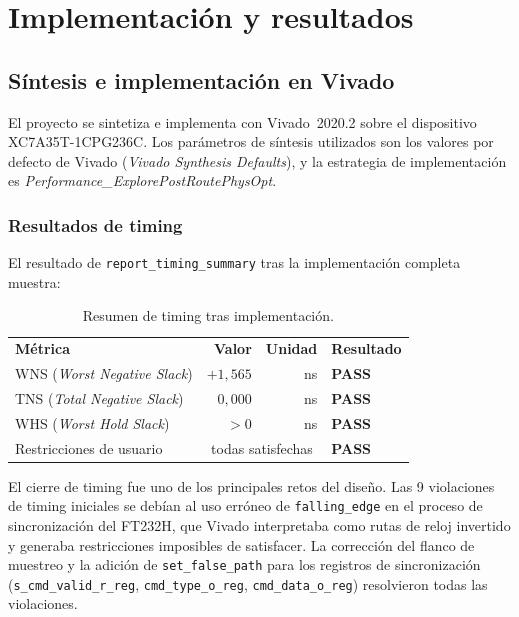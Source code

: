 \documentclass[../main.tex]{subfiles}
\begin{document}
\chapter{Implementación y resultados}
\label{chap:implementacion}

\section{Síntesis e implementación en Vivado}

El proyecto se sintetiza e implementa con Vivado~2020.2 sobre el dispositivo XC7A35T-1CPG236C. Los parámetros de síntesis utilizados son los valores por defecto de Vivado (\textit{Vivado Synthesis Defaults}), y la estrategia de implementación es \textit{Performance\_ExplorePostRoutePhysOpt}.

\subsection{Resultados de timing}

El resultado de \texttt{report\_timing\_summary} tras la implementación completa muestra:

\begin{table}[h]
\centering
\caption{Resumen de timing tras implementación.}
\label{tab:timing}
\begin{tabular}{lrrl}
\rowcolor[HTML]{156082}
{\color{white}\textbf{Métrica}} & {\color{white}\textbf{Valor}} & {\color{white}\textbf{Unidad}} & {\color{white}\textbf{Resultado}} \\
\rowcolor[HTML]{C0E6F5}
WNS (\textit{Worst Negative Slack}) & $+1{,}565$ & ns & \textbf{PASS} \\
TNS (\textit{Total Negative Slack}) & $0{,}000$ & ns & \textbf{PASS} \\
\rowcolor[HTML]{C0E6F5}
WHS (\textit{Worst Hold Slack}) & $> 0$ & ns & \textbf{PASS} \\
Restricciones de usuario & \multicolumn{2}{c}{todas satisfechas} & \textbf{PASS} \\
\end{tabular}
\end{table}

El cierre de timing fue uno de los principales retos del diseño. Las 9 violaciones de timing iniciales se debían al uso erróneo de \texttt{falling\_edge} en el proceso de sincronización del FT232H, que Vivado interpretaba como rutas de reloj invertido y generaba restricciones imposibles de satisfacer. La corrección del flanco de muestreo y la adición de \texttt{set\_false\_path} para los registros de sincronización (\texttt{s\_cmd\_valid\_r\_reg}, \texttt{cmd\_type\_o\_reg}, \texttt{cmd\_data\_o\_reg}) resolvieron todas las violaciones.
\end{document}
